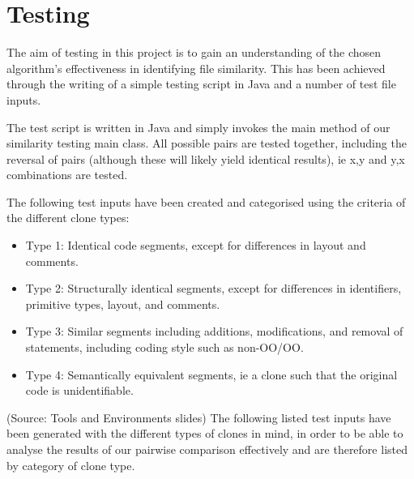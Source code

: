 \section{Testing}
The aim of testing in this project is to gain an understanding of the chosen algorithm's effectiveness in identifying file similarity. This has been achieved through the writing of a simple testing script in Java and a number of test file inputs.

The test script is written in Java and simply invokes the main method of our similarity testing main class. All possible pairs are tested together, including the reversal of pairs (although these will likely yield identical results), ie x,y and y,x combinations are tested.  

The following test inputs have been created and categorised using the criteria of the different clone types:
\begin{itemize}
\item Type 1: Identical code segments, except for differences in layout and comments.
\item Type 2: Structurally identical segments, except for differences in identifiers, primitive types, layout, and comments.
\item Type 3: Similar segments including additions, modifications, and removal of statements, including coding style such as non-OO/OO.
\item Type 4: Semantically equivalent segments, ie a clone such that the original code is unidentifiable.
\end{itemize}
(Source: Tools and Environments slides)
The following listed test inputs have been generated with the different types of clones in mind, in order to be able to analyse the results of our pairwise comparison effectively and are therefore listed by category of clone type.
